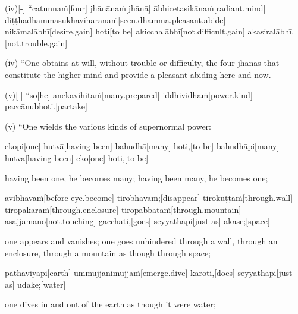 \begin{samepage}
\begingl[glneveryline={\PaliGlossA,\PaliGlossB}]
(iv)[-] “catunnaṁ[four] jhānānaṁ[jhānā] ābhicetasikānaṁ[radiant.mind] diṭṭhadhammasukhavihārānaṁ[seen.dhamma.pleasant.abide] nikāmalābhī[desire.gain] hoti[to be] akicchalābhī[not.difficult.gain] akasiralābhī.[not.trouble.gain]
\endgl
\nopagebreak
\linespread{0.5}
\begin{spacin}{0.2}
{\PaliGlossFT (iv) “One obtains at will, without trouble or difficulty, the four jhānas that constitute the higher mind and  provide a pleasant abiding here and now.}
\end{spacin}
\vskip 12pt
\end{samepage}
\begin{samepage}
\begingl[glneveryline={\PaliGlossA,\PaliGlossB}]
(v)[-] “so[he] anekavihitaṁ[many.prepared] iddhividhaṁ[power.kind] paccānubhoti.[partake]
\endgl
\nopagebreak
\linespread{0.5}
\begin{spacin}{0.2}
{\PaliGlossFT (v) “One wields the various kinds of supernormal power:}
\end{spacin}
\vskip 12pt
\end{samepage}
\begin{samepage}
\begingl[glneveryline={\PaliGlossA,\PaliGlossB}]
ekopi[one] hutvā[having been] bahudhā[many] hoti,[to be] bahudhāpi[many] hutvā[having been] eko[one] hoti,[to be]
\endgl
\nopagebreak
\linespread{0.5}
\begin{spacin}{0.2}
{\PaliGlossFT having been one, he becomes many; having been many, he becomes one;}
\end{spacin}
\vskip 12pt
\end{samepage}
\begin{samepage}
\begingl[glneveryline={\PaliGlossA,\PaliGlossB}]
āvibhāvaṁ[before eye.become] tirobhāvaṁ;[disappear] tirokuṭṭaṁ[through.wall] tiropākāraṁ[through.enclosure] tiropabbataṁ[through.mountain] asajjamāno[not.touching] gacchati,[goes] seyyathāpi[just as] ākāse;[space]
\endgl
\nopagebreak
\linespread{0.5}
\begin{spacin}{0.2}
{\PaliGlossFT one appears and vanishes; one goes unhindered through a wall, through an enclosure, through a mountain as though through space;}
\end{spacin}
\vskip 12pt
\end{samepage}
\begin{samepage}
\begingl[glneveryline={\PaliGlossA,\PaliGlossB}]
pathaviyāpi[earth] ummujjanimujjaṁ[emerge.dive] karoti,[does] seyyathāpi[just as] udake;[water]
\endgl
\nopagebreak
\linespread{0.5}
\begin{spacin}{0.2}
{\PaliGlossFT one dives in and out of the earth as though it were water;}
\end{spacin}
\vskip 12pt
\end{samepage}

